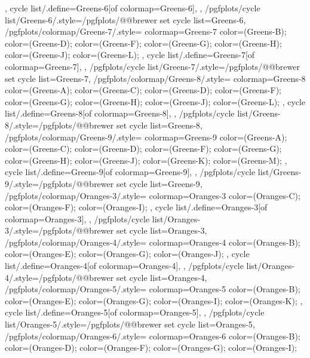 {{{    },
    cycle list/.define={Greens-6}{[of colormap=Greens-6]},
  },
  /pgfplots/cycle list/Greens-6/.style={/pgfplots/@@brewer set cycle list={Greens-6}},
  /pgfplots/colormap/Greens-7/.style={
    colormap={Greens-7}{
      color=(Greens-B);
      color=(Greens-D);
      color=(Greens-F);
      color=(Greens-G);
      color=(Greens-H);
      color=(Greens-J);
      color=(Greens-L);
    },
    cycle list/.define={Greens-7}{[of colormap=Greens-7]},
  },
  /pgfplots/cycle list/Greens-7/.style={/pgfplots/@@brewer set cycle list={Greens-7}},
  /pgfplots/colormap/Greens-8/.style={
    colormap={Greens-8}{
      color=(Greens-A);
      color=(Greens-C);
      color=(Greens-D);
      color=(Greens-F);
      color=(Greens-G);
      color=(Greens-H);
      color=(Greens-J);
      color=(Greens-L);
    },
    cycle list/.define={Greens-8}{[of colormap=Greens-8]},
  },
  /pgfplots/cycle list/Greens-8/.style={/pgfplots/@@brewer set cycle list={Greens-8}},
  /pgfplots/colormap/Greens-9/.style={
    colormap={Greens-9}{
      color=(Greens-A);
      color=(Greens-C);
      color=(Greens-D);
      color=(Greens-F);
      color=(Greens-G);
      color=(Greens-H);
      color=(Greens-J);
      color=(Greens-K);
      color=(Greens-M);
    },
    cycle list/.define={Greens-9}{[of colormap=Greens-9]},
  },
  /pgfplots/cycle list/Greens-9/.style={/pgfplots/@@brewer set cycle list={Greens-9}},
  /pgfplots/colormap/Oranges-3/.style={
    colormap={Oranges-3}{
      color=(Oranges-C);
      color=(Oranges-F);
      color=(Oranges-I);
    },
    cycle list/.define={Oranges-3}{[of colormap=Oranges-3]},
  },
  /pgfplots/cycle list/Oranges-3/.style={/pgfplots/@@brewer set cycle list={Oranges-3}},
  /pgfplots/colormap/Oranges-4/.style={
    colormap={Oranges-4}{
      color=(Oranges-B);
      color=(Oranges-E);
      color=(Oranges-G);
      color=(Oranges-J);
    },
    cycle list/.define={Oranges-4}{[of colormap=Oranges-4]},
  },
  /pgfplots/cycle list/Oranges-4/.style={/pgfplots/@@brewer set cycle list={Oranges-4}},
  /pgfplots/colormap/Oranges-5/.style={
    colormap={Oranges-5}{
      color=(Oranges-B);
      color=(Oranges-E);
      color=(Oranges-G);
      color=(Oranges-I);
      color=(Oranges-K);
    },
    cycle list/.define={Oranges-5}{[of colormap=Oranges-5]},
  },
  /pgfplots/cycle list/Oranges-5/.style={/pgfplots/@@brewer set cycle list={Oranges-5}},
  /pgfplots/colormap/Oranges-6/.style={
    colormap={Oranges-6}{
      color=(Oranges-B);
      color=(Oranges-D);
      color=(Oranges-F);
      color=(Oranges-G);
      color=(Oranges-I);
}}}
